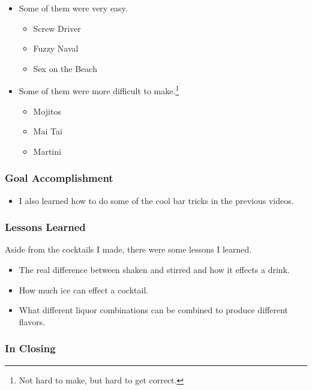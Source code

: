 \documentclass[xclolor=dvipsnames]{beamer}            %
\begin{document}
\begin{darkframes}
\begin{frame}
\begin{itemize}
            \item Some of them were very easy.
                \begin{itemize}
                    \item Screw Driver
                    \item Fuzzy Naval
                    \item Sex on the Beach
                \end{itemize}

            \item Some of them were more difficult to make.\footnote{Not hard to make, but hard to get correct.}
                \begin{itemize}
                    \item Mojitos
                    \item Mai Tai
                    \item Martini
                \end{itemize}
        \end{itemize}
    \end{frame}

    \begin{frame}
        \frametitle{Goal Accomplishment}

        \begin{itemize}
            \item I also learned how to do some of the cool bar tricks in the previous videos.
        \end{itemize}
    \end{frame}


    \begin{frame}
        \frametitle{Lessons Learned}

        Aside from the cocktails I made, there were some lessons I learned.

        \begin{itemize}
            \item The real difference between shaken and stirred and how it effects a drink.
            \item How much ice can effect a cocktail.
            \item What different liquor combinations can be combined to produce different flavors.
        \end{itemize}

    \end{frame}

    \begin{frame}
        \frametitle{In Closing}


\end{frame}
\end{darkframes}
\end{document}
